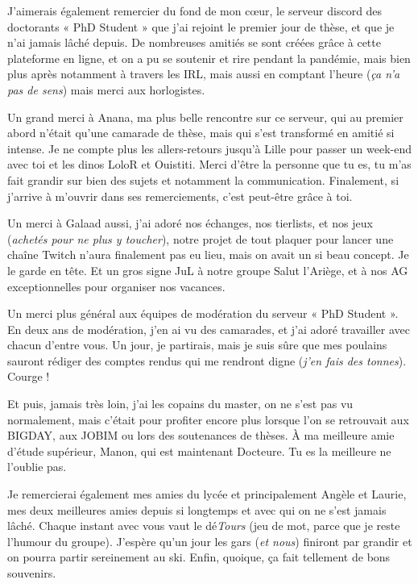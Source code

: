 \par J’aimerais également remercier du fond de mon cœur, le serveur discord des doctorants « PhD Student » que j’ai rejoint le premier jour de thèse, et que je n’ai jamais lâché depuis. De nombreuses amitiés se sont créées grâce à cette plateforme en ligne, et on a pu se soutenir et rire pendant la pandémie, mais bien plus après notamment à travers les IRL, mais aussi en comptant l’heure (\textit{ça n’a pas de sens}) mais merci aux horlogistes. 
\par Un grand merci à Anana, ma plus belle rencontre sur ce serveur, qui au premier abord n’était qu’une camarade de thèse, mais qui s’est transformé en amitié si intense. Je ne compte plus les allers-retours jusqu’à Lille pour passer un week-end avec toi et les dinos LoloR et Ouistiti. Merci d’être la personne que tu es, tu m’as fait grandir sur bien des sujets et notamment la communication. Finalement, si j’arrive à m’ouvrir dans ses remerciements, c’est peut-être grâce à toi. 
\par Un merci à Galaad aussi, j’ai adoré nos échanges, nos tierlists, et nos jeux (\textit{achetés pour ne plus y toucher}), notre projet de tout plaquer pour lancer une chaîne Twitch n’aura finalement pas eu lieu, mais on avait un si beau concept. Je le garde en tête. Et un gros signe JuL à notre groupe Salut l’Ariège, et à nos AG exceptionnelles pour organiser nos vacances. 
\par Un merci plus général aux équipes de modération du serveur « PhD Student ». En deux ans de modération, j’en ai vu des camarades, et j’ai adoré travailler avec chacun d’entre vous. Un jour, je partirais, mais je suis sûre que mes poulains sauront rédiger des comptes rendus qui me rendront digne (\textit{j’en fais des tonnes}). Courge ! 
\par Et puis, jamais très loin, j’ai les copains du master, on ne s’est pas vu normalement, mais c’était pour profiter encore plus lorsque l’on se retrouvait aux BIGDAY, aux JOBIM ou lors des soutenances de thèses. À ma meilleure amie d'étude supérieur, Manon, qui est maintenant Docteure. Tu es la meilleure ne l’oublie pas. 
\par Je remercierai également mes amies du lycée et principalement Angèle et Laurie, mes deux meilleures amies depuis si longtemps et avec qui on ne s’est jamais lâché. Chaque instant avec vous vaut le dé\textit{Tours} (jeu de mot, parce que je reste l’humour du groupe). J’espère qu’un jour les gars (\textit{et nous}) finiront par grandir et on pourra partir sereinement au ski. Enfin, quoique, ça fait tellement de bons souvenirs. 
